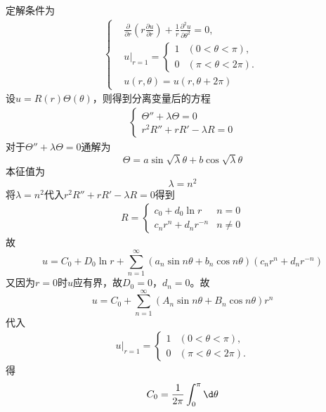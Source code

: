 \documentclass{phyasgn}
\begin{document}
\begin{sol}[1]
    定解条件为
    \begin{align*}
        \left\{
        \begin{aligned}
            &\frac{\partial}{\partial r}\left( r \frac{\partial u}{\partial r} \right) + \frac{1}{r} \frac{\partial^2 u}{\partial \theta^2} = 0, \\
            &u|_{r=1} =
            \begin{cases}
                1 & (0 < \theta < \pi), \\
                0 & (\pi < \theta < 2\pi).
            \end{cases}\\
            &u(r,\theta)=u(r,\theta+2\pi)
        \end{aligned}
        \right.
    \end{align*}
    设$u=R(r)\Theta(\theta)$，则得到分离变量后的方程
    \begin{align*}
        \left\{\begin{matrix}
            \Theta''+\lambda\Theta=0\\
            r^2R''+rR'-\lambda R=0
        \end{matrix}\right.
    \end{align*}
    对于$\Theta''+\lambda\Theta=0$通解为
    $$\Theta=a\sin\sqrt{\lambda}\theta+b\cos\sqrt{\lambda}\theta$$
    本征值为
    $$\lambda=n^2$$
    将$\lambda=n^2$代入$r^2R''+rR'-\lambda R=0$得到
    \begin{align*}
        R=\left\{\begin{matrix}
            c_0+d_0\ln r&n=0\\
            c_nr^n+d_nr^{-n}&n\neq 0
        \end{matrix}\right.
    \end{align*}
    故
    $$u=C_0+D_0\ln r+\sum_{n=1}^{\infty}\left(a_n\sin n\theta+b_n\cos n\theta\right)\left(c_nr^n+d_nr^{-n}\right)$$
    又因为$r=0$时$u$应有界，故$D_0=0$，$d_n=0$。故
    $$u=C_0+\sum_{n=1}^{\infty}\left(A_n\sin n\theta+B_n\cos n\theta\right)r^n$$
    代入\begin{align*}
        u|_{r=1} =
            \begin{cases}
                1 & (0 < \theta < \pi), \\
                0 & (\pi < \theta < 2\pi).
            \end{cases}
    \end{align*}
    得
    \begin{align*}
        C_0&=\frac{1}{2\pi}\int_{0}^{\pi}\d \theta\\

\end{align*}
\end{sol}
\end{document}
